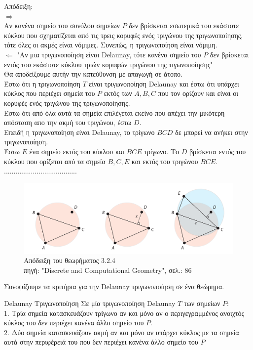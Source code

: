 \documentclass[oneside,12pt]{book}
\newenvironment{matlab}
	{\begin{figure}[hp]\centering\captionsetup{justification=centering}}
	{\end{figure}}
\theoremstyle{definition}
\begin{document}
Απόδειξη: \\
\(\Rightarrow \) \\
Αν κανένα σημείο του συνόλου σημείων \(P\) δεν βρίσκεται εσωτερικά του εκάστοτε κύκλου που σχηματίζεται από τις τρεις κορυφές ενός τριγώνου της τριγωνοποίησης, τότε όλες οι ακμές είναι νόμιμες. Συνεπώς, η τριγωνοποίηση είναι νόμιμη. \\
\(\Leftarrow \) "Αν μια τριγωνοποίηση είναι Delaunay, τότε κανένα σημείο του \(P\) δεν βρίσκεται εντός του εκάστοτε κύκλου τριών κορυφών τριγώνου της τιγωνοποίησης" \\
Θα αποδείξουμε αυτήν την κατεύθυνση με απαγωγή σε άτοπο. \\
Έστω ότι η τριγωνοποίηση \(T\) είναι τριγωνοποίηση Delaunay και έστω ότι υπάρχει κύκλος που περιέχει σημεία του \(P\) εκτός των \(A, B, C\) που τον ορίζουν και είναι οι κορυφές ενός τριγώνου της τριγωνοποίησης. \\
Έστω ότι από όλα αυτά τα σημεία επιλέγεται εκείνο που απέχει την μικότερη απόσταση απο την ακμή του τριγώνου, έστω \(D\). \\
Επειδή η τριγωνοποίηση είναι Delaunay, το τρίγωνο \(BCD\) δε μπορεί να ανήκει στην τριγωνοποίηση. \\
Έστω \(Ε\) ένα σημείο εκτός του κύκλου και \(BCE\) τρίγωνο. Το \(D\) βρίσκεται εντός του κύκλου που ορίζεται από τα σημεία \(B, C, E\) και εκτός του τριγώνου \(BCE\). 
......................................

\begin{matlab}
	\includegraphics[scale=0.3]{images/emptycircle.png}
	\caption{Απόδειξη του θεωρήματος 3.2.4 \\ πηγή: "Discrete and Computational Geometry", σελ.: 86}
\end{matlab} 

Συνοψίζουμε τα κριτήρια για την Delaunay τριγωνοποίηση σε ένα θεώρημα. \\

\begin{mytheorem}{Delaunay Τριγωνοποίηση}{}
	Σε μία τριγωνοποίηση Delaunay \(T\) των σημείων \(P\): \\
	1. Τρία σημεία κατασκευάζουν τρίγωνο αν και μόνο αν ο περιγεγραμμένος ανοιχτός κύκλος του δεν περιέχει κανένα άλλο σημείο του \(P\). \\
	2. Δύο σημεία κατασκευάζουν ακμή αν και μόνο αν υπάρχει κύκλος με τα σημεία αυτά στην περιφέρειά του που δεν περιέχει κανένα άλλο σημείο του \(P\) 	
\end{mytheorem}
\end{document}
